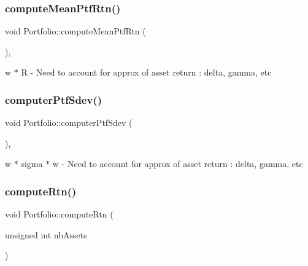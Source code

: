 \subsubsection{\texorpdfstring{compute\+Mean\+Ptf\+Rtn()}{computeMeanPtfRtn()}}
{\footnotesize\ttfamily void Portfolio\+::compute\+Mean\+Ptf\+Rtn (\begin{DoxyParamCaption}{ }\end{DoxyParamCaption})\hspace{0.3cm}{\ttfamily [inline]}, {\ttfamily [protected]}}



w\textquotesingle{} $\ast$ R -\/ Need to account for approx of asset return \+: delta, gamma, etc 

\hypertarget{classPortfolio_aeaba88f92093501fb98c60c83b600529}{}\label{classPortfolio_aeaba88f92093501fb98c60c83b600529} 
\subsubsection{\texorpdfstring{computer\+Ptf\+Sdev()}{computerPtfSdev()}}
{\footnotesize\ttfamily void Portfolio\+::computer\+Ptf\+Sdev (\begin{DoxyParamCaption}{ }\end{DoxyParamCaption})\hspace{0.3cm}{\ttfamily [inline]}, {\ttfamily [protected]}}



w\textquotesingle{} $\ast$ sigma $\ast$ w -\/ Need to account for approx of asset return \+: delta, gamma, etc 

\hypertarget{classPortfolio_aa00669a3d5caece170ee8b28c0c67a2d}{}\label{classPortfolio_aa00669a3d5caece170ee8b28c0c67a2d} 
\subsubsection{\texorpdfstring{compute\+Rtn()}{computeRtn()}}
{\footnotesize\ttfamily void Portfolio\+::compute\+Rtn (\begin{DoxyParamCaption}\item[{unsigned int}]{nb\+Assets }\end{DoxyParamCaption})}

\hypertarget{classPortfolio_a56baf8410ef9a0c450e5fa558ac4254f}{}\label{classPortfolio_a56baf8410ef9a0c450e5fa558ac4254f} 
